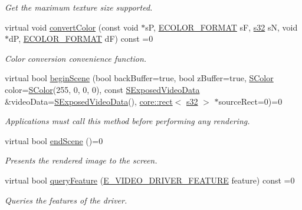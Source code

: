\begin{DoxyCompactItemize}
\begin{DoxyCompactList}\small\item\em Get the maximum texture size supported. \end{DoxyCompactList}\item 
virtual void \hyperlink{classirr_1_1video_1_1IVideoDriver_afb541967dbb2def61997f1d69f68d5d1}{convert\+Color} (const void $\ast$sP, \hyperlink{namespaceirr_1_1video_a1d5e487888c32b1674a8f75116d829ed}{E\+C\+O\+L\+O\+R\+\_\+\+F\+O\+R\+M\+AT} sF, \hyperlink{namespaceirr_ac66849b7a6ed16e30ebede579f9b47c6}{s32} sN, void $\ast$dP, \hyperlink{namespaceirr_1_1video_a1d5e487888c32b1674a8f75116d829ed}{E\+C\+O\+L\+O\+R\+\_\+\+F\+O\+R\+M\+AT} dF) const =0
\begin{DoxyCompactList}\small\item\em Color conversion convenience function. \end{DoxyCompactList}\item 
virtual bool \hyperlink{classirr_1_1video_1_1IVideoDriver_a015b8f2f18c260a00a858181be1e9945}{begin\+Scene} (bool back\+Buffer=true, bool z\+Buffer=true, \hyperlink{classirr_1_1video_1_1SColor}{S\+Color} color=\hyperlink{classirr_1_1video_1_1SColor}{S\+Color}(255, 0, 0, 0), const \hyperlink{structirr_1_1video_1_1SExposedVideoData}{S\+Exposed\+Video\+Data} \&video\+Data=\hyperlink{structirr_1_1video_1_1SExposedVideoData}{S\+Exposed\+Video\+Data}(), \hyperlink{classirr_1_1core_1_1rect}{core\+::rect}$<$ \hyperlink{namespaceirr_ac66849b7a6ed16e30ebede579f9b47c6}{s32} $>$ $\ast$source\+Rect=0)=0
\begin{DoxyCompactList}\small\item\em Applications must call this method before performing any rendering. \end{DoxyCompactList}\item 
virtual bool \hyperlink{classirr_1_1video_1_1IVideoDriver_a75f61a93c5fc9fdf161c044d27bc994e}{end\+Scene} ()=0
\begin{DoxyCompactList}\small\item\em Presents the rendered image to the screen. \end{DoxyCompactList}\item 
virtual bool \hyperlink{classirr_1_1video_1_1IVideoDriver_adde468368b77441ada246e1603da4f47}{query\+Feature} (\hyperlink{namespaceirr_1_1video_a57b1721e42a79c5dcf8e830e3621e08f}{E\+\_\+\+V\+I\+D\+E\+O\+\_\+\+D\+R\+I\+V\+E\+R\+\_\+\+F\+E\+A\+T\+U\+RE} feature) const =0
\begin{DoxyCompactList}\small\item\em Queries the features of the driver. \end{DoxyCompactList}\item 

\end{DoxyCompactItemize}
